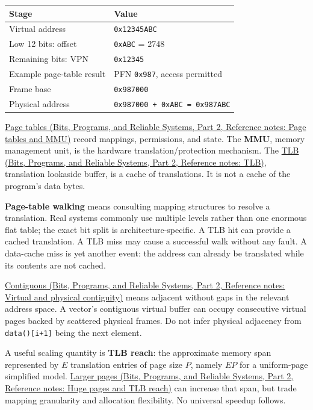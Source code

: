 {\def\LTcaptype{none} %
\begin{longtable}[]{@{}ll@{}}
\toprule\noalign{}
Stage & Value \\
\midrule\noalign{}
\endhead
\bottomrule\noalign{}
\endlastfoot
Virtual address & \texttt{0x12345ABC} \\
Low 12 bits: offset & \texttt{0xABC} = 2748 \\
Remaining bits: VPN & \texttt{0x12345} \\
Example page-table result & PFN \texttt{0x987}, access permitted \\
Frame base & \texttt{0x987000} \\
Physical address & \texttt{0x987000\ +\ 0xABC\ =\ 0x987ABC} \\
\end{longtable}
}

\href{../01-Bits-Programs-and-Reliable-Systems-P02/main.pdf\#nameddest=appendix-01e5905165c4}{Page tables (Bits, Programs, and Reliable Systems, Part 2, Reference notes: Page tables and MMU)} record mappings, permissions, and state. The \textbf{MMU}, memory management unit, is the hardware translation/protection mechanism. The \href{../01-Bits-Programs-and-Reliable-Systems-P02/main.pdf\#nameddest=appendix-7a2d9c5ce511}{TLB (Bits, Programs, and Reliable Systems, Part 2, Reference notes: TLB)}, translation lookaside buffer, is a cache of translations. It is not a cache of the program's data bytes.

\textbf{Page-table walking} means consulting mapping structures to resolve a translation. Real systems commonly use multiple levels rather than one enormous flat table; the exact bit split is architecture-specific. A TLB hit can provide a cached translation. A TLB miss may cause a successful walk without any fault. A data-cache miss is yet another event: the address can already be translated while its contents are not cached.

\href{../01-Bits-Programs-and-Reliable-Systems-P02/main.pdf\#nameddest=appendix-f897c1ddac8f}{Contiguous (Bits, Programs, and Reliable Systems, Part 2, Reference notes: Virtual and physical contiguity)} means adjacent without gaps in the relevant address space. A vector's contiguous virtual buffer can occupy consecutive virtual pages backed by scattered physical frames. Do not infer physical adjacency from \texttt{data(){[}i+1{]}} being the next element.

A useful scaling quantity is \textbf{TLB reach}: the approximate memory span represented by \(E\) translation entries of page size \(P\), namely \(EP\) for a uniform-page simplified model. \href{../01-Bits-Programs-and-Reliable-Systems-P02/main.pdf\#nameddest=appendix-ce688d1acdab}{Larger pages (Bits, Programs, and Reliable Systems, Part 2, Reference notes: Huge pages and TLB reach)} can increase that span, but trade mapping granularity and allocation flexibility. No universal speedup follows.

